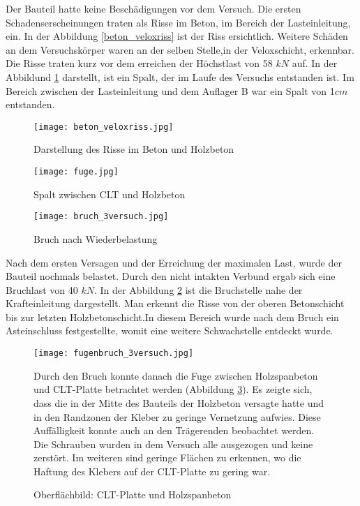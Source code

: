 \documentclass[12 pt,a4 paper ]{scrreprt}
\begin{document}
Der Bauteil hatte keine Beschädigungen vor dem Versuch.
Die ersten Schadenserscheinungen traten als Risse im Beton, im Bereich der Lasteinleitung, ein. In der Abbildung \ref{beton_veloxriss} ist der Riss ersichtlich. Weitere Schäden an dem Versuchskörper waren an der selben Stelle,in der Veloxschicht, erkennbar. Die Risse traten kurz vor dem erreichen der Höchstlast von 58 $ kN $ auf. In der Abbildund \ref{spalt} darstellt, ist ein Spalt, der im Laufe des Versuchs entstanden ist. Im Bereich zwischen der Lasteinleitung und dem Auflager B war ein Spalt von 1$ cm $ entstanden. 

\begin{figure}[h]
\begin{minipage}[hbt]{6cm}	
	\texttt{[image: beton\_veloxriss.jpg]}
	\caption{Darstellung des Risse im Beton und Holzbeton}
	\label{beton_veloxriss}
\end{minipage}
\hfill
\begin{minipage}[hbt]{8cm}
	\texttt{[image: fuge.jpg]}
	\caption{Spalt zwischen CLT und Holzbeton}
	\label{spalt}
\end{minipage}
\end{figure}


\begin{figure}
\begin{center}
	\texttt{[image: bruch\_3versuch.jpg]}
	\caption{Bruch nach Wiederbelastung }
	\label{bruch_3versuch}
\end{center}
\end{figure}

Nach dem ersten Versagen und der Erreichung der maximalen Last, wurde der Bauteil  nochmals belastet. Durch den nicht intakten Verbund ergab sich eine Bruchlast von 40  $ kN $. In der Abbildung \ref{bruch_3versuch} ist die Bruchstelle nahe der Krafteinleitung dargestellt. Man erkennt die Risse von der oberen Betonschicht bis zur letzten Holzbetonschicht.In diesem Bereich wurde nach dem Bruch ein Asteinschluss festgestellte, womit eine weitere Schwachstelle entdeckt wurde.\\


\begin{figure}
\begin{minipage}[hbt]{5cm}
	\texttt{[image: fugenbruch\_3versuch.jpg]}
	\caption{Oberflächbild: CLT-Platte und Holzspanbeton}
	\label{fugenbruch_3versuch}
\end{minipage}
\hfill
\begin{minipage}[hbt]{7cm}
Durch den Bruch konnte danach die Fuge zwischen Holzspanbeton und CLT-Platte betrachtet werden (Abbildung \ref{fugenbruch_3versuch}). Es zeigte sich, dass die in der Mitte des Bauteils der Holzbeton versagte hatte und in den Randzonen der Kleber zu geringe Vernetzung aufwies. Diese Auffälligkeit konnte auch an den Trägerenden beobachtet werden. Die Schrauben wurden in dem Versuch alle ausgezogen und keine zerstört.
Im weiteren sind geringe Flächen zu erkennen, wo die Haftung des Klebers auf der CLT-Platte zu gering war.  
\end{minipage}
\end{figure}
\end{document}
